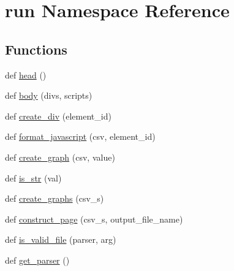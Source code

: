 \hypertarget{namespacerun}{}\section{run Namespace Reference}
\label{namespacerun}
\subsection*{Functions}
\begin{DoxyCompactItemize}
\item 
def \hyperlink{namespacerun_a3b08d60d4cd53151ec8838a221d7633a}{head} ()
\item 
def \hyperlink{namespacerun_a74bf2289c79392f74f7e88f2b381c20b}{body} (divs, scripts)
\item 
def \hyperlink{namespacerun_a4d228a662f6694eccdf9dc2d3f8f8480}{create\+\_\+div} (element\+\_\+id)
\item 
def \hyperlink{namespacerun_aa81671265a932a7f4c19bd73d09bc82d}{format\+\_\+javascript} (csv, element\+\_\+id)
\item 
def \hyperlink{namespacerun_acb5629f312402624c95b661fcff63a1f}{create\+\_\+graph} (csv, value)
\item 
def \hyperlink{namespacerun_a9b88a64554a7a02253851f2600a120cd}{is\+\_\+str} (val)
\item 
def \hyperlink{namespacerun_aebb94f64622b7c51906e78dac4dd8000}{create\+\_\+graphs} (csv\+\_\+s)
\item 
def \hyperlink{namespacerun_a8dc739a3ea482ed259b95d09e93d0c50}{construct\+\_\+page} (csv\+\_\+s, output\+\_\+file\+\_\+name)
\item 
def \hyperlink{namespacerun_aae2313534d495ae2febd2a904c81492b}{is\+\_\+valid\+\_\+file} (parser, arg)
\item 
def \hyperlink{namespacerun_a348b64b33bf6392bcfe25dcda942ea43}{get\+\_\+parser} ()
\end{DoxyCompactItemize}
